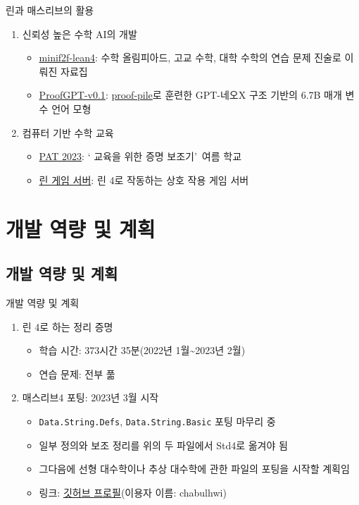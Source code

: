 \documentclass{beamer}
\begin{document}
\begin{frame}{린과 매스리브의 활용}
  \begin{enumerate}
    \item 신뢰성 높은 수학 AI의 개발
    \begin{itemize}
      \item \href{https://huggingface.co/datasets/hoskinson-center/minif2f-lean4}{minif2f-lean4}:
        수학 올림피아드, 고교 수학, 대학 수학의 연습 문제 진술로 이뤄진
        자료집
      \item \href{https://huggingface.co/hoskinson-center/proofGPT-v0.1-6.7B}{ProofGPT-v0.1}:
        \href{https://huggingface.co/datasets/hoskinson-center/proof-pile}{proof-pile}로
        훈련한 GPT-네오X 구조 기반의 6.7B 매개 변수 언어 모형
    \end{itemize}
    \item 컴퓨터 기반 수학 교육
    \begin{itemize}
      \item \href{https://pat2023.icube.unistra.fr/}{PAT 2023}: \textquoteleft
        교육을 위한 증명 보조기\textquoteright\ 여름 학교
      \item \href{https://adam.math.hhu.de/}{린 게임 서버}: 린 4로 작동하는 상호
        작용 게임 서버
    \end{itemize}
  \end{enumerate}
\end{frame}

\section{개발 역량 및 계획}

\subsection{개발 역량 및 계획}

\begin{frame}[fragile]{개발 역량 및 계획}
  \begin{enumerate}
    \item 린 4로 하는 정리 증명 \autocite{tpil4}
    \begin{itemize}
      \item 학습 시간: 373시간 35분(2022년 1월\textasciitilde2023년 2월)
      \item 연습 문제: 전부 풂
    \end{itemize}
    \item 매스리브4 포팅: 2023년 3월 시작
    \begin{itemize}
      \item \verb|Data.String.Defs|, \verb|Data.String.Basic| 포팅 마무리 중
      \item 일부 정의와 보조 정리를 위의 두 파일에서 Std4로 옮겨야 됨
      \item 그다음에 선형 대수학이나 추상 대수학에 관한 파일의 포팅을 시작할 계획임
      \item 링크: \href{https://github.com/chabulhwi/}{깃허브 프로필}(이용자 이름:
        chabulhwi)
    \end{itemize}
  \end{enumerate}
\end{frame}
\end{document}
